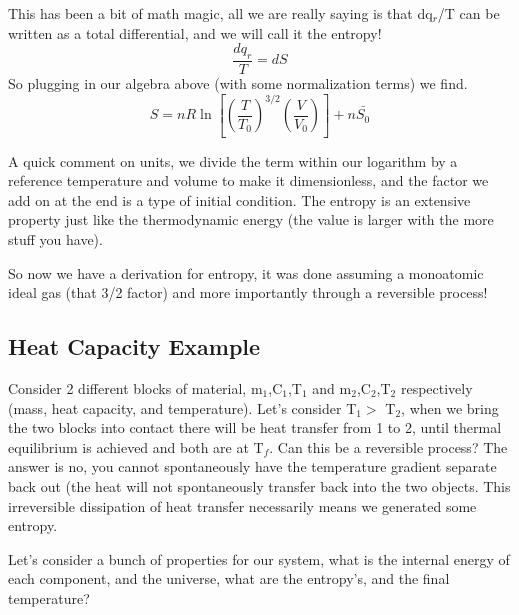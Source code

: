\documentclass{article}
\begin{document}
This has been a bit of math magic, all we are really saying is that dq$_r$/T can be written as a total differential, and we will call it the entropy!
\begin{equation}
\frac{dq_r}{T} = dS
\end{equation}
So plugging in our algebra above (with some normalization terms) we find. 
\begin{equation}
S = nR\ln\left[ \left(\frac{T}{T_0} \right)^{3/2} \left(\frac{V}{V_0} \right) \right ] + n\bar{S_0}
\end{equation}

 A quick comment on units, we divide the term within our logarithm by a reference temperature and volume to make it dimensionless, and the factor we add on at the end is a type of initial condition. 
 The entropy is an extensive property just like the thermodynamic energy (the value is larger with the more stuff you have). 
 
 So now we have a derivation for entropy, it was done assuming a monoatomic ideal gas (that 3/2 factor) and more importantly through a reversible process!
 
 \subsection*{Heat Capacity Example}
 Consider 2 different blocks of material, m$_1$,C$_1$,T$_1$ and m$_2$,C$_2$,T$_2$ respectively (mass, heat capacity, and temperature). 
Let's consider T$_1 > $ T$_2$, when we bring the two blocks into contact there will be heat transfer from 1 to 2, until thermal equilibrium is achieved and both are at T$_f$. 
Can this be a reversible process?
The answer is no, you cannot spontaneously have the temperature gradient separate back out (the heat will not spontaneously transfer back into the two objects. 
This irreversible dissipation of heat transfer necessarily means we generated some entropy. 

Let's consider a bunch of properties for our system, what is the internal energy of each component, and the universe, what are the entropy's, and the final temperature?
\end{document}
